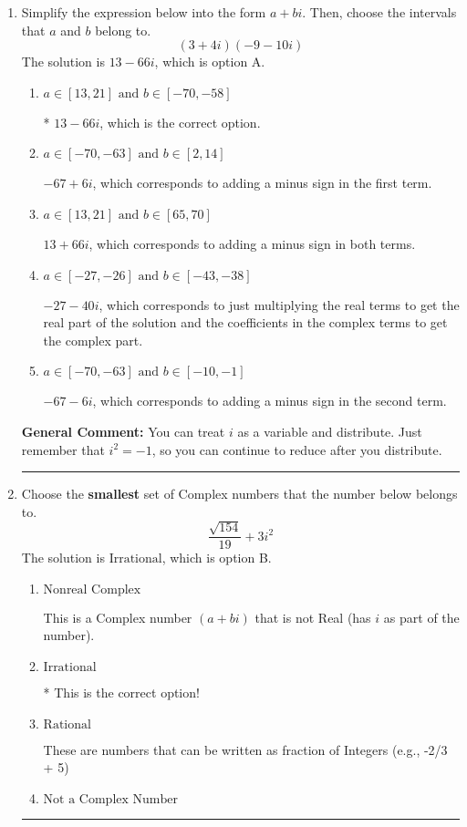 \documentclass{extbook}[14pt]
\newcommand{\litem}[1]{\item #1

\rule{\textwidth}{0.4pt}}
\begin{document}
\begin{enumerate}\litem{
Simplify the expression below into the form $a+bi$. Then, choose the intervals that $a$ and $b$ belong to.
\[ (3 + 4 i)(-9 - 10 i) \]The solution is \( 13 - 66 i \), which is option A.\begin{enumerate}[label=\Alph*.]
\item \( a \in [13, 21] \text{ and } b \in [-70, -58] \)

* $13 - 66 i$, which is the correct option.
\item \( a \in [-70, -63] \text{ and } b \in [2, 14] \)

 $-67 + 6 i$, which corresponds to adding a minus sign in the first term.
\item \( a \in [13, 21] \text{ and } b \in [65, 70] \)

 $13 + 66 i$, which corresponds to adding a minus sign in both terms.
\item \( a \in [-27, -26] \text{ and } b \in [-43, -38] \)

 $-27 - 40 i$, which corresponds to just multiplying the real terms to get the real part of the solution and the coefficients in the complex terms to get the complex part.
\item \( a \in [-70, -63] \text{ and } b \in [-10, -1] \)

 $-67 - 6 i$, which corresponds to adding a minus sign in the second term.
\end{enumerate}

\textbf{General Comment:} You can treat $i$ as a variable and distribute. Just remember that $i^2=-1$, so you can continue to reduce after you distribute.
}
\litem{
Choose the \textbf{smallest} set of Complex numbers that the number below belongs to.
\[ \frac{\sqrt{154}}{19}+3i^2 \]The solution is \( \text{Irrational} \), which is option B.\begin{enumerate}[label=\Alph*.]
\item \( \text{Nonreal Complex} \)

This is a Complex number $(a+bi)$ that is not Real (has $i$ as part of the number).
\item \( \text{Irrational} \)

* This is the correct option!
\item \( \text{Rational} \)

These are numbers that can be written as fraction of Integers (e.g., -2/3 + 5)
\item \( \text{Not a Complex Number} \)


\end{enumerate}}
\end{enumerate}
\end{document}
